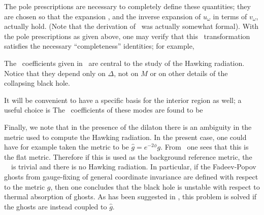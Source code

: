 %
The pole prescriptions are necessary to completely define
these quantities; they are
chosen so that the expansion \bogdef , and the inverse expansion of
$u_{\omega}$ in terms of $v_{\omega}$, actually hold. (Note that the
derivation of \bogc\ was actually somewhat formal).
With the pole prescriptions as given above, one may verify that
this \Bog\ transformation satisfies the necessary ``completeness'' identities;
for example,
%
\eqn{}

The \Bog\ coefficients
given in \bogxm\ are central to the study of the Hawking
radiation.
Notice  that they
depend only on $\Delta$, not on $M$ or on other details of the collapsing
black hole.

It will be convenient to have a specific basis for the interior region as
well; a useful choice is
%
\eqn{}
%
The \Bog\ coefficients of these modes are found to be
%
\eqn{}
%

%
%

Finally, we note that in the presence of the dilaton there is an ambiguity
in the metric used to compute the Hawking radiation.  In the present case,
one could have for example taken the metric to be ${\hat g}=e^{-2\phi} g$.
{}From
\collsoln\ one sees that this is the flat metric.  Therefore if this
is used as the background reference metric,
the \Bog\ \Xm\ is trivial and there is no Hawking radiation.  In
particular, if the Fadeev-Popov ghosts from gauge-fixing of general
coordinate invariance are defined with respect to the metric $g$, then one
concludes that the black hole is unstable with respect to thermal
absorption of ghosts.  As has been
suggested in , this problem is solved if the ghosts are
instead
coupled to ${\hat g}$.


